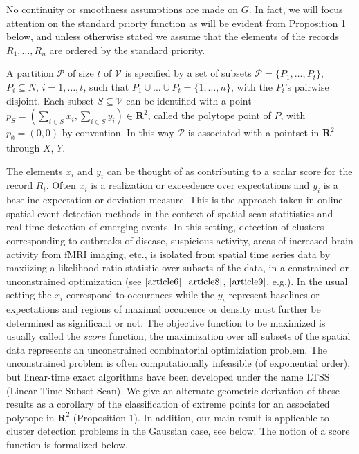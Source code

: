 \documentclass{article}
\theoremstyle{case}
\begin{document}
No continuity or smoothness assumptions are made on $G$. In fact, we will focus attention on the standard priorty function as will be evident from Proposition 1 below, and unless otherwise stated we assume that the elements of the records $R_1, \dots, R_n$ are ordered by the standard priority.

A partition $\mathcal{P}$ of size $t$ of $\mathcal{V}$ is specified by a set of subsets $\mathcal{P} = \{ P_1, \dots, P_t \}$, $P_i \subseteq N$, $i = 1, \dots, t$, such that $P_1 \cup \dots \cup P_t = \{1, \dots, n\}$, with the $P_i$'s pairwise disjoint. Each subset $S \subseteq \mathcal{V}$ can be identified with a point $p_S = (\sum_{i \in S} x_i, \sum_{i \in S}y_i) \in \mathbf{R}^2$, called the polytope point of $P$, with $p_{\emptyset} = (0,0)$ by convention. In this way $\mathcal{P}$ is associated with a pointset in $\mathbf{R}^2$ through $X$, $Y$.

The elements $x_i$ and $y_i$ can be thought of as contributing to a scalar score for the record $R_i$. Often $x_i$ is a realization or exceedence over expectations and $y_i$ is a baseline expectation or deviation measure. This is the approach taken in online spatial event detection methods in the context of spatial scan statitistics and real-time detection of emerging events. In this setting, detection of clusters corresponding to outbreaks of disease, suspicious activity, areas of increased brain activity from fMRI imaging, etc., is isolated from spatial time series data by maxiizing a likelihood ratio statistic over subsets of the data, in a constrained or unconstrained optimization (see $\cite{article6}$ $\cite{article8}$, $\cite{article9}$, e.g.). In the usual setting the $x_i$ correspond to occurences while the $y_i$ represent baselines or expectations and regions of maximal occurence or density must further be determined as significant or not. The objective function to be maximized is usually called the $\textit{score}$ function, the maximization over all subsets of the spatial data represents an unconstrained combinatorial optimiziation problem. The unconstrained problem is often computationally infeasible (of exponential order), but linear-time exact algorithms have been developed under the name LTSS (Linear Time Subset Scan). We give an alternate geometric derivation of these results as a corollary of the classification of extreme points for an associated polytope in $\mathbf{R}^2$ (Proposition 1). In addition, our main result is applicable to cluster detection problems in the Gaussian case, see below. The notion of a score function is formalized below.
\end{document}
